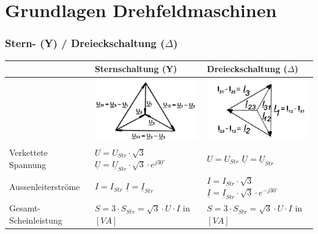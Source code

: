 \section{Grundlagen Drehfeldmaschinen}
    \subsubsection{Stern- (Y) / Dreieckschaltung ($\Delta$)}
        \renewcommand{\arraystretch}{2}
        \begin{tabular}{| p{4.5cm} | l | l |}
            \hline
            &
            Sternschaltung (Y) &
            Dreieckschaltung ($\Delta$) \\
            \hline
            \vspace{0.2cm} &
            \includegraphics[width=5cm]{images/Sternspannung.png} &
            \includegraphics[width=5cm]{images/Dreieckstrom.png} \\
            \hline
            Verkettete Spannung &
            $U = U_{Str} \cdot \sqrt{3}$ \hspace{0.2cm} $\underline{U} = \underline{U}_{Str} \cdot \sqrt{3} \cdot e^{j 30^\circ}$ &
            $U = U_{Str}$ \hspace{0.2cm} $\underline{U} = \underline{U}_{Str}$ \\
            \hline
            Aussenleiterströme &
            $I = I_{Str}$ \hspace{0.2cm} $\underline{I} = \underline{I}_{Str}$ &
            $I = I_{Str} \cdot \sqrt{3} $ \hspace{0.2cm} $\underline{I} = \underline{I}_{Str} \cdot \sqrt{3} \cdot e^{-j 30^\circ} $ \\
            \hline
            Gesamt-Scheinleistung &
            $S = 3 \cdot S_{Str} =\sqrt{3} \cdot U \cdot I $ \hspace{0.2cm} in $[VA]$ &
            $S = 3 \cdot S_{Str} = \sqrt{3} \cdot U \cdot I$ \hspace{0.2cm} in $[VA]$ \\

\end{tabular}
